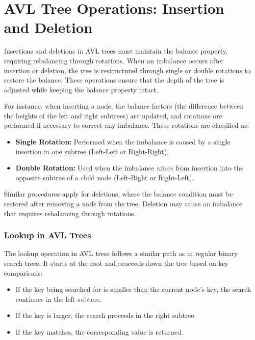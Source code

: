 \section{AVL Tree Operations: Insertion and Deletion}
Insertions and deletions in AVL trees must maintain the balance property, requiring rebalancing through rotations. When an imbalance occurs after insertion or deletion, the tree is restructured through single or double rotations to restore the balance. These operations ensure that the depth of the tree is adjusted while keeping the balance property intact.

For instance, when inserting a node, the balance factors (the difference between the heights of the left and right subtrees) are updated, and rotations are performed if necessary to correct any imbalance. These rotations are classified as:
\begin{itemize}
	\item \textbf{Single Rotation:} Performed when the imbalance is caused by a single insertion in one subtree (Left-Left or Right-Right).
	\item \textbf{Double Rotation:} Used when the imbalance arises from insertion into the opposite subtree of a child node (Left-Right or Right-Left).
\end{itemize}
Similar procedures apply for deletions, where the balance condition must be restored after removing a node from the tree. Deletion may cause an imbalance that requires rebalancing through rotations.

\subsubsection{Lookup in AVL Trees}
The lookup operation in AVL trees follows a similar path as in regular binary search trees. It starts at the root and proceeds down the tree based on key comparisons:
\begin{itemize}
    \item If the key being searched for is smaller than the current node's key, the search continues in the left subtree.
    \item If the key is larger, the search proceeds in the right subtree.
    \item If the key matches, the corresponding value is returned.
\end{itemize}


